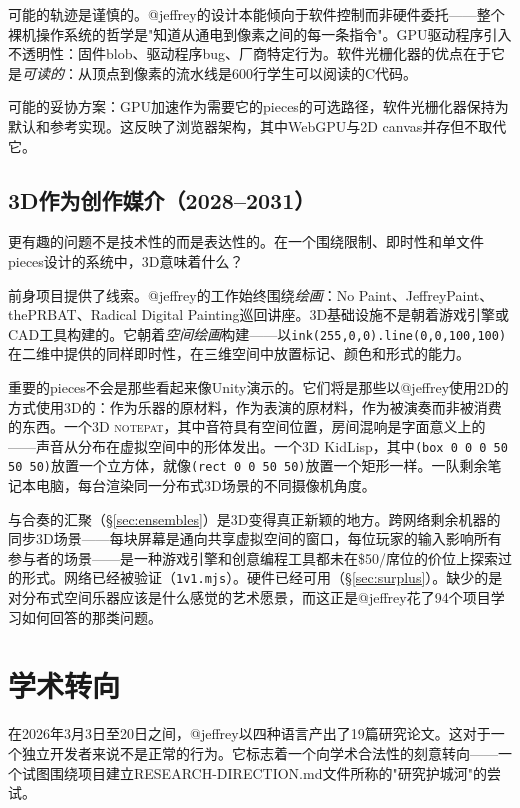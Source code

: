\documentclass[10pt,letterpaper,twocolumn]{article}
\newcommand{\np}{\textsc{notepat}}
\begin{document}
可能的轨迹是谨慎的。@jeffrey的设计本能倾向于软件控制而非硬件委托——整个裸机操作系统的哲学是"知道从通电到像素之间的每一条指令"。GPU驱动程序引入不透明性：固件blob、驱动程序bug、厂商特定行为。软件光栅化器的优点在于它是\emph{可读的}：从顶点到像素的流水线是600行学生可以阅读的C代码。

可能的妥协方案：GPU加速作为需要它的pieces的可选路径，软件光栅化器保持为默认和参考实现。这反映了浏览器架构，其中WebGPU与2D canvas并存但不取代它。

\subsection{3D作为创作媒介（2028--2031）}

更有趣的问题不是技术性的而是表达性的。在一个围绕限制、即时性和单文件pieces设计的系统中，3D意味着什么？

前身项目提供了线索。@jeffrey的工作始终围绕\emph{绘画}：No Paint、JeffreyPaint、thePRBAT、Radical Digital Painting巡回讲座。3D基础设施不是朝着游戏引擎或CAD工具构建的。它朝着\emph{空间绘画}构建——以\texttt{ink(255,0,0).line(0,0,100,100)}在二维中提供的同样即时性，在三维空间中放置标记、颜色和形式的能力。

重要的pieces不会是那些看起来像Unity演示的。它们将是那些以@jeffrey使用2D的方式使用3D的：作为乐器的原材料，作为表演的原材料，作为被演奏而非被消费的东西。一个3D \np{}，其中音符具有空间位置，房间混响是字面意义上的——声音从分布在虚拟空间中的形体发出。一个3D KidLisp，其中\texttt{(box 0 0 0 50 50 50)}放置一个立方体，就像\texttt{(rect 0 0 50 50)}放置一个矩形一样。一队剩余笔记本电脑，每台渲染同一分布式3D场景的不同摄像机角度。

与合奏的汇聚（\S\ref{sec:ensembles}）是3D变得真正新颖的地方。跨网络剩余机器的同步3D场景——每块屏幕是通向共享虚拟空间的窗口，每位玩家的输入影响所有参与者的场景——是一种游戏引擎和创意编程工具都未在\$50/席位的价位上探索过的形式。网络已经被验证（\texttt{1v1.mjs}）。硬件已经可用（\S\ref{sec:surplus}）。缺少的是对分布式空间乐器应该是什么感觉的艺术愿景，而这正是@jeffrey花了94个项目学习如何回答的那类问题。


\section{学术转向}
\label{sec:scholarly}

在2026年3月3日至20日之间，@jeffrey以四种语言产出了19篇研究论文。这对于一个独立开发者来说不是正常的行为。它标志着一个向学术合法性的刻意转向——一个试图围绕项目建立RESEARCH-DIRECTION.md文件所称的"研究护城河"的尝试。
\end{document}
